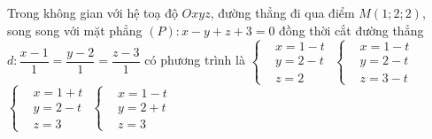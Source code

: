 \begin{ex}%
	Trong không gian với hệ toạ độ $Oxyz$, đường thẳng đi qua điểm $M(1;2;2)$, song song với mặt phẳng $(P)\colon x-y+z+3=0$ đồng thời cắt đường thẳng $d\colon \dfrac{x-1}{1}=\dfrac{y-2}{1}=\dfrac{z-3}{1}$ có phương trình là
	\choice
	{\True $\left\{\begin{aligned}
		&x=1-t \\
		&y=2-t \\
		&z=2
		\end{aligned}\right. $}
	{$\left\{\begin{aligned}
		&x=1-t \\
		&y=2-t \\
		&z=3-t
		\end{aligned}\right. $}
	{$\left\{\begin{aligned}
		&x=1+t \\
		&y=2-t \\
		&z=3
		\end{aligned}\right. $}
	{$\left\{\begin{aligned}
		&x=1-t \\
		&y=2+t \\
		&z=3
		\end{aligned}\right. $}
\end{ex}

